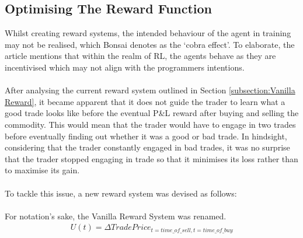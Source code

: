 \documentclass[ %
                    author={Ashwinder Khurana},
                supervisor={Prof Dave Cliff},
                    degree={MEng},
                     title={The Deeply Reinforced Trader},
                  subtitle={},
                      type={enterprise},
                      year={2020} ]{dissertation}
\begin{document}
{\subsection{Optimising The Reward Function}
\label{subsection:Optimising The Reward Function} 
Whilst creating reward systems, the intended behaviour of the agent in training may not be realised, which Bonsai denotes as the \enquote*{cobra effect}\cite{cobra-effect}. To elaborate, the article mentions that within the realm of RL, the agents behave as they are incentivised which may not align with the programmers intentions. 
\\
\\
After analysing the current reward system outlined in Section \ref{subsection:Vanilla Reward}, it became apparent that it does not guide the trader to learn what a good trade looks like before the eventual P\&L reward after buying and selling the commodity. This would mean that the trader would have to engage in two trades before eventually finding out whether it was a good or bad trade. In hindsight, considering that the trader constantly engaged in bad trades, it was no surprise that the trader stopped engaging in trade so that it minimises its loss rather than to maximise its gain. 
\\
\\
To tackle this issue, a new reward system was devised as follows:
\\
\\
For notation's sake, the Vanilla Reward System was renamed.
\begin{equation}
\label{Vanilla Reward}
\begin{split}
U(t) = \Delta TradePrice_{t=time\_of\_ sell, t=time\_of\_buy}
\end{split}
\end{equation}

}
\end{document}
